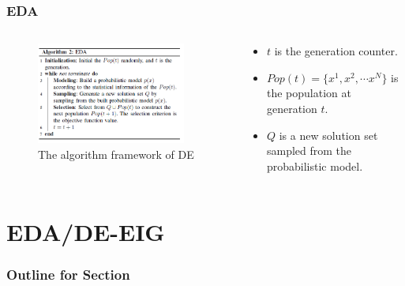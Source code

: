 \documentclass[xcolor=dvipsnames]{beamer}
\begin{document}
    \begin{frame}
    \frametitle{EDA}
    \begin{columns}
        \begin{column}{0.5\textwidth}
        \begin{figure}[H]
            \graphicspath{{figs/}}
            \includegraphics[width=0.9\textwidth]{eda.png}
            \caption{The algorithm framework of DE}
        \end{figure}
    \end{column}
    \begin{column}{0.5\textwidth}
    \begin{itemize}\small
    \setlength\itemsep{0em}
    \item $t$ is the generation counter.
    \item $Pop(t)=\{x^1,x^2, \cdots x^N\}$ is the population at generation $t$.
    \item $Q$ is a new solution set sampled from the probabilistic model.
    \end{itemize}
    \end{column}
    \end{columns}
    \end{frame}


    \section{EDA/DE-EIG}
    \begin{frame}
      \frametitle{Outline for Section \thesection}
      \tableofcontents[currentsection]
    \end{frame}
        
\end{document}
